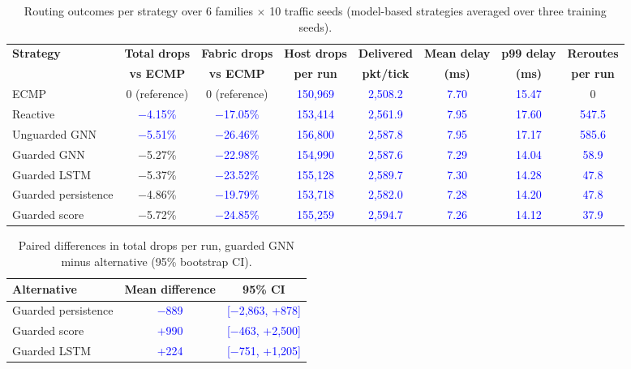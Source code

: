 \documentclass[conference]{IEEEtran}
\newcommand{\chk}[1]{\textcolor{blue}{#1}}
\begin{document}
\begin{table}[!t]
\centering
\caption{Routing outcomes per strategy over 6 families $\times$ 10 traffic seeds (model-based strategies averaged over three training seeds).}
\label{tab:routing}
\footnotesize
\setlength{\tabcolsep}{4pt}
\begin{tabular}{lccccccc}
\toprule
\textbf{Strategy} & \textbf{Total drops} & \textbf{Fabric drops} & \textbf{Host drops} & \textbf{Delivered} & \textbf{Mean delay} & \textbf{p99 delay} & \textbf{Reroutes}\\
 & \textbf{vs ECMP} & \textbf{vs ECMP} & \textbf{per run} & \textbf{pkt/tick} & \textbf{(ms)} & \textbf{(ms)} & \textbf{per run}\\
\midrule
ECMP & 0 (reference) & 0 (reference) & \chk{150,969} & \chk{2,508.2} & \chk{7.70} & \chk{15.47} & 0\\
Reactive & \chk{$-$4.15\%} & \chk{$-$17.05\%} & \chk{153,414} & \chk{2,561.9} & \chk{7.95} & \chk{17.60} & \chk{547.5}\\
Unguarded GNN & \chk{$-$5.51\%} & \chk{$-$26.46\%} & \chk{156,800} & \chk{2,587.8} & \chk{7.95} & \chk{17.17} & \chk{585.6}\\
Guarded GNN & $-$5.27\% & \chk{$-$22.98\%} & \chk{154,990} & \chk{2,587.6} & \chk{7.29} & \chk{14.04} & \chk{58.9}\\
Guarded LSTM & $-$5.37\% & \chk{$-$23.52\%} & \chk{155,128} & \chk{2,589.7} & \chk{7.30} & \chk{14.28} & \chk{47.8}\\
Guarded persistence & $-$4.86\% & \chk{$-$19.79\%} & \chk{153,718} & \chk{2,582.0} & \chk{7.28} & \chk{14.20} & \chk{47.8}\\
Guarded score & $-$5.72\% & \chk{$-$24.85\%} & \chk{155,259} & \chk{2,594.7} & \chk{7.26} & \chk{14.12} & \chk{37.9}\\
\bottomrule
\end{tabular}
\end{table}

\begin{table}[!t]
\centering
\caption{Paired differences in total drops per run, guarded GNN minus alternative (95\% bootstrap CI).}
\label{tab:paired}
\footnotesize
\begin{tabular}{lcc}
\toprule
\textbf{Alternative} & \textbf{Mean difference} & \textbf{95\% CI}\\
\midrule
Guarded persistence & \chk{$-$889} & \chk{[$-$2,863, +878]}\\
Guarded score & \chk{+990} & \chk{[$-$463, +2,500]}\\
Guarded LSTM & \chk{+224} & \chk{[$-$751, +1,205]}\\
\bottomrule
\end{tabular}
\end{table}
\end{document}
